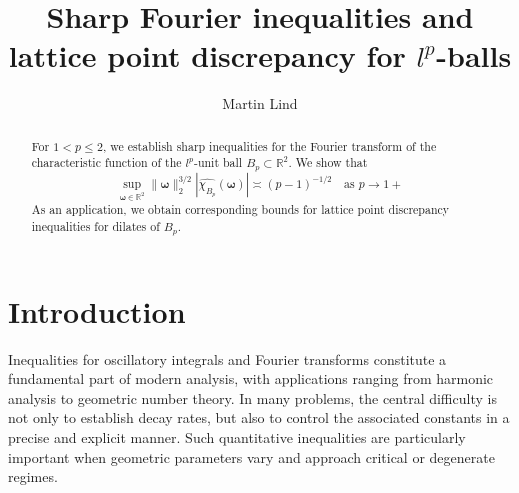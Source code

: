 \documentclass{amsart}
\numberwithin{equation}{section}
\begin{document}
\title[Fourier inequalities for $l^p$-balls]{Sharp Fourier inequalities and lattice point discrepancy for $l^p$-balls}


\author{Martin Lind}
\address{Department of Mathematics and Computer Science, Karlstad University, Universitetsgatan 2, 65188 Karlstad, Sweden}






\begin{abstract}

For $1<p\le 2$, we establish sharp inequalities for the Fourier transform of the characteristic function of the $l^p$-unit ball $B_p\subset\mathbb{R}^2$. We show that
$$
\sup_{\boldsymbol{\omega}\in\mathbb{R}^2}\|\boldsymbol{\omega}\|_2^{3/2}|\widehat{\chi_{B_p}}(\boldsymbol{\omega})|\asymp (p-1)^{-1/2}\quad\text{as }p\rightarrow1+
$$
As an application, we obtain corresponding bounds for lattice point discrepancy inequalities for dilates of $B_p$.



\end{abstract}


\maketitle

\section{Introduction}

Inequalities for oscillatory integrals and Fourier transforms constitute a fundamental part of modern analysis, with applications ranging from harmonic analysis to geometric number theory. In many problems, the central difficulty is not only to establish decay rates, but also to control the associated constants in a precise and explicit manner. Such quantitative inequalities are particularly important when geometric parameters vary and approach critical or degenerate regimes.
\end{document}
